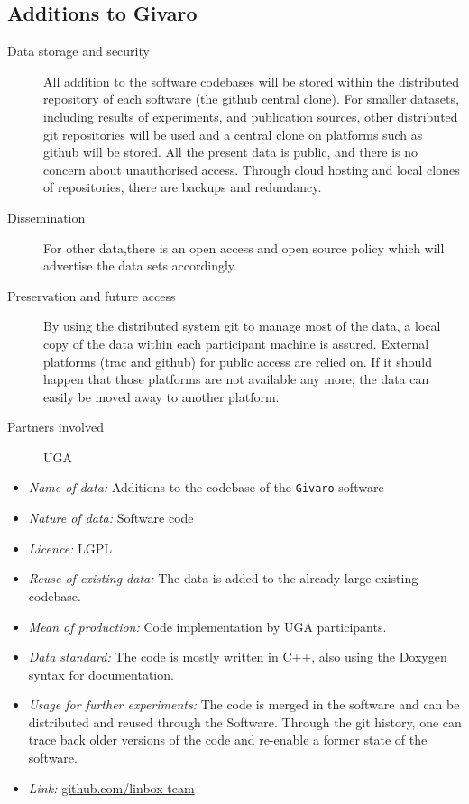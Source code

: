 \documentclass{deliverablereport}
\begin{document}
\begin{enumerate}
\subsection{Additions to Givaro}

\begin{description}
\item[Data storage and security] All addition to the software codebases will be stored within the distributed repository of each software (the github central clone). For smaller datasets, including results of experiments, and publication sources, other distributed git repositories will be used and a central clone on platforms such as github will be stored. All the present data is public, and there is no concern about unauthorised access. Through cloud hosting and local clones of repositories, there are backups and redundancy.
\item[Dissemination] For other data,there is an open access and open source policy which will advertise the data sets accordingly.
\item[Preservation and future access] By using the distributed system git to manage most of the data, a local copy of the data within each participant machine is assured. External platforms (trac and github) for public access are relied on. If it should happen that those platforms are not available any more, the data can easily be moved away to another platform.
\item[Partners involved] UGA
\end{description}


\begin{itemize}
\item\textit{Name of data:} Additions to the codebase of the \texttt{Givaro} software
\item\textit{Nature of data:} Software code
\item\textit{Licence:} LGPL
\item\textit{Reuse of existing data:} The data is added to the already large existing codebase.
\item\textit{Mean of production:} Code implementation by UGA participants.
\item\textit{Data standard:} The code is mostly written in C++, also using the Doxygen syntax for documentation.
\item\textit{Usage for further experiments:} The code is merged in the software and can be distributed and reused through the Software. Through the git history,
one can trace back older versions of the code and re-enable a former state of the software.
\item\textit{Link:} \href{https://github.com/linbox-team}{github.com/linbox-team}
\end{itemize}




\end{enumerate}
\end{document}
